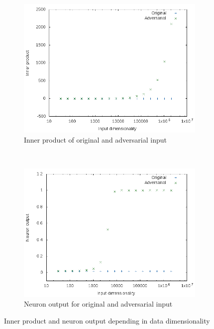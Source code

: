 \documentclass[11pt, a4paper]{article}
\begin{document}
\begin{figure}[htp]
    \centering
    \begin{subfigure}[b]{0.45\textwidth}
        \includegraphics[width=\textwidth]{ae_explanation_ip.png}
        \caption{Inner product of original and adversarial input}
        \label{fig:ae-explanation-inner-product}
    \end{subfigure}
    ~ %
    \begin{subfigure}[b]{0.45\textwidth}
        \includegraphics[width=\textwidth]{ae_explanation_output.png}
        \caption{Neuron output for original and adversarial input}
        \label{fig:ae-explanation-neuron-output}
    \end{subfigure}
    \caption{Inner product and neuron output depending in data dimensionality}
    \label{fig:ae-explanation}
\end{figure}
\end{document}

